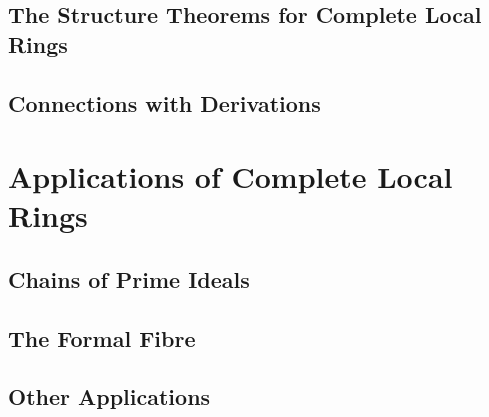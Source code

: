\subsection{The Structure Theorems for Complete Local Rings}
\subsection{Connections with Derivations}

\section{Applications of Complete Local Rings}
\subsection{Chains of Prime Ideals}
\subsection{The Formal Fibre}
\subsection{Other Applications}

